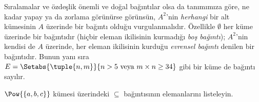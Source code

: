 \documentclass[../../../include/open-logic-section]{subfiles}
\begin{document}
\begin{explain}
Sıralamalar ve özdeşlik önemli ve doğal bağıntılar olsa da tanımımıza göre,
ne kadar yapay ya da zorlama görünürse görünsün, $A^{2}$'nin \emph{herhangi}
bir alt kümesinin $A$ üzerinde bir bağıntı olduğu vurgulanmalıdır. Özellikle
$\emptyset$ her küme üzerinde bir bağıntıdır (hiçbir eleman ikilisinin kurmadığı
\emph{boş bağıntı}); $A^{2}$'nin kendisi de $A$ üzerinde, her eleman ikilisinin
kurduğu \emph{evrensel bağıntı} denilen bir bağıntıdır. Bunun yanı sıra
$E=\Setabs{\tuple{n, m}}{n>5 \text{ veya } m \times n \ge 34}$ gibi bir küme de
bağıntı sayılır.
\end{explain}

\begin{prob}
  $\Pow{\{a, b, c\}}$ kümesi üzerindeki $\subseteq$ bağıntısının elemanlarını
  listeleyin.
\end{prob}
\end{document}
